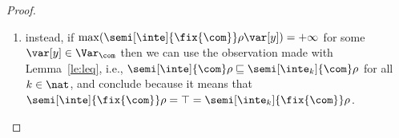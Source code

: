 \begin{proof}
\begin{enumerate}[label=(\roman*)]
  \item instead, if
    \({\max(\semi[\inte]{\fix{\com}}\rho\var[y])} = +\infty\) for some
    \(\var[y]\in \Var_{\com}\) then we can use the observation made
    with Lemma~\ref{le:leq}, i.e., 
    \({\semi[\inte]{\com}\rho} \sqsubseteq
    {\semi[\inte_k]{\com}\rho}\) for all \({k \in \nat}\), and
    conclude because it means that
    \({\semi[\inte]{\fix{\com}}\rho} = \top =
    {\semi[\inte_k]{\fix{\com}}\rho}\).
  \end{enumerate}
\end{proof}
